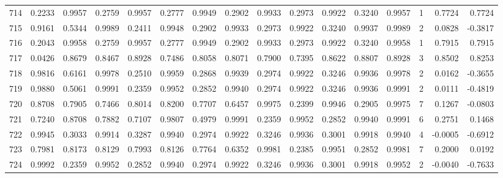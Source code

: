 \begin{tabular}{lrrrrrrrrrrrrrrr}
714 &      0.2233 &  0.9957 &  0.2759 &  0.9957 &  0.2777 &  0.9949 &  0.2902 &  0.9933 &  0.2973 &  0.9922 &   0.3240 &     0.9957 &      1 &                    0.7724 &                     0.7724 \\
715 &      0.9161 &  0.5344 &  0.9989 &  0.2411 &  0.9948 &  0.2902 &  0.9933 &  0.2973 &  0.9922 &  0.3240 &   0.9937 &     0.9989 &      2 &                    0.0828 &                    -0.3817 \\
716 &      0.2043 &  0.9958 &  0.2759 &  0.9957 &  0.2777 &  0.9949 &  0.2902 &  0.9933 &  0.2973 &  0.9922 &   0.3240 &     0.9958 &      1 &                    0.7915 &                     0.7915 \\
717 &      0.0426 &  0.8679 &  0.8467 &  0.8928 &  0.7486 &  0.8058 &  0.8071 &  0.7900 &  0.7395 &  0.8622 &   0.8807 &     0.8928 &      3 &                    0.8502 &                     0.8253 \\
718 &      0.9816 &  0.6161 &  0.9978 &  0.2510 &  0.9959 &  0.2868 &  0.9939 &  0.2974 &  0.9922 &  0.3246 &   0.9936 &     0.9978 &      2 &                    0.0162 &                    -0.3655 \\
719 &      0.9880 &  0.5061 &  0.9991 &  0.2359 &  0.9952 &  0.2852 &  0.9940 &  0.2974 &  0.9922 &  0.3246 &   0.9936 &     0.9991 &      2 &                    0.0111 &                    -0.4819 \\
720 &      0.8708 &  0.7905 &  0.7466 &  0.8014 &  0.8200 &  0.7707 &  0.6457 &  0.9975 &  0.2399 &  0.9946 &   0.2905 &     0.9975 &      7 &                    0.1267 &                    -0.0803 \\
721 &      0.7240 &  0.8708 &  0.7882 &  0.7107 &  0.9807 &  0.4979 &  0.9991 &  0.2359 &  0.9952 &  0.2852 &   0.9940 &     0.9991 &      6 &                    0.2751 &                     0.1468 \\
722 &      0.9945 &  0.3033 &  0.9914 &  0.3287 &  0.9940 &  0.2974 &  0.9922 &  0.3246 &  0.9936 &  0.3001 &   0.9918 &     0.9940 &      4 &                   -0.0005 &                    -0.6912 \\
723 &      0.7981 &  0.8173 &  0.8129 &  0.7993 &  0.8126 &  0.7764 &  0.6352 &  0.9981 &  0.2385 &  0.9951 &   0.2852 &     0.9981 &      7 &                    0.2000 &                     0.0192 \\
724 &      0.9992 &  0.2359 &  0.9952 &  0.2852 &  0.9940 &  0.2974 &  0.9922 &  0.3246 &  0.9936 &  0.3001 &   0.9918 &     0.9952 &      2 &                   -0.0040 &                    -0.7633 \\

\end{tabular}
